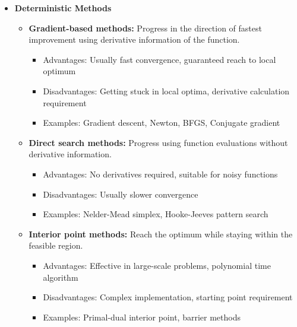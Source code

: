 \begin{itemize}
    \item \textbf{Deterministic Methods}
        \begin{itemize}
            \item \textbf{Gradient-based methods:} Progress in the direction of fastest improvement using derivative information of the function.
                \begin{itemize}
                    \item Advantages: Usually fast convergence, guaranteed reach to local optimum
                    \item Disadvantages: Getting stuck in local optima, derivative calculation requirement
                    \item Examples: Gradient descent, Newton, BFGS, Conjugate gradient
                \end{itemize}
                
            \item \textbf{Direct search methods:} Progress using function evaluations without derivative information.
                \begin{itemize}
                    \item Advantages: No derivatives required, suitable for noisy functions
                    \item Disadvantages: Usually slower convergence
                    \item Examples: Nelder-Mead simplex, Hooke-Jeeves pattern search
                \end{itemize}
                
            \item \textbf{Interior point methods:} Reach the optimum while staying within the feasible region.
                \begin{itemize}
                    \item Advantages: Effective in large-scale problems, polynomial time algorithm
                    \item Disadvantages: Complex implementation, starting point requirement
                    \item Examples: Primal-dual interior point, barrier methods
                \end{itemize}
        \end{itemize}
    

\end{itemize}
